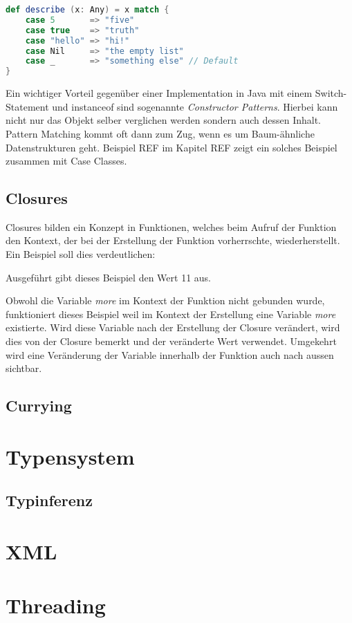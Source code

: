 \begin{lstlisting}[float=ht,language=scala,caption=Pattern Matching auf Litale \cite{odersky},label=lst:patternMatching]
def describe (x: Any) = x match {
	case 5       => "five"
	case true    => "truth"
	case "hello" => "hi!"
	case Nil     => "the empty list"
	case _       => "something else" // Default
}
\end{lstlisting}

Ein wichtiger Vorteil gegenüber einer Implementation in Java mit
einem Switch-Statement und instanceof sind sogenannte 
\emph{Constructor Patterns}. Hierbei kann nicht nur das Objekt selber
verglichen werden sondern auch dessen Inhalt. \\

Pattern Matching kommt oft dann zum Zug, wenn es um Baum-ähnliche
Datenstrukturen geht. Beispiel REF im Kapitel REF zeigt ein solches
Beispiel zusammen mit Case Classes.

\subsection{Closures}

Closures bilden ein Konzept in Funktionen, welches beim Aufruf der 
Funktion den Kontext, der bei der Erstellung der Funktion vorherrschte,
wiederherstellt. \\

Ein Beispiel soll dies verdeutlichen:



Ausgeführt gibt dieses Beispiel den Wert 11 aus.

Obwohl die Variable \emph{more} im Kontext der Funktion nicht gebunden
wurde, funktioniert dieses Beispiel weil im Kontext der Erstellung eine
Variable \emph{more} existierte. Wird diese Variable nach der
Erstellung der Closure verändert, wird dies von der Closure bemerkt und 
der veränderte Wert verwendet. Umgekehrt wird eine Veränderung der
Variable innerhalb der Funktion auch nach aussen sichtbar.

\subsection{Currying}

\section{Typensystem}

\subsection{Typinferenz}

\section{XML}

\section{Threading}
